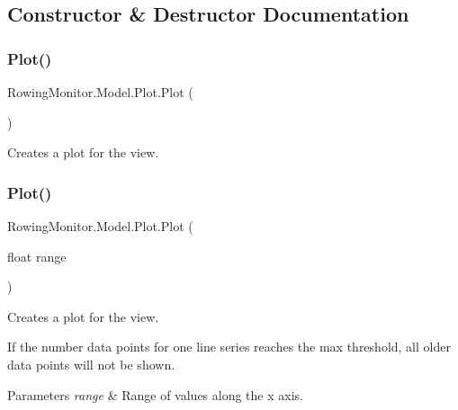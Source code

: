 \subsection{Constructor \& Destructor Documentation}
\mbox{\label{class_rowing_monitor_1_1_model_1_1_plot_a950ad596730f1ff80a5998f16a4c0d3c}} 
\subsubsection{\texorpdfstring{Plot()}{Plot()}\hspace{0.1cm}{\footnotesize\ttfamily [1/2]}}
{\footnotesize\ttfamily Rowing\+Monitor.\+Model.\+Plot.\+Plot (\begin{DoxyParamCaption}{ }\end{DoxyParamCaption})}



Creates a plot for the view. 

\mbox{\label{class_rowing_monitor_1_1_model_1_1_plot_a12760bee76f583deb2741bc223be33e2}} 
\subsubsection{\texorpdfstring{Plot()}{Plot()}\hspace{0.1cm}{\footnotesize\ttfamily [2/2]}}
{\footnotesize\ttfamily Rowing\+Monitor.\+Model.\+Plot.\+Plot (\begin{DoxyParamCaption}\item[{float}]{range }\end{DoxyParamCaption})}



Creates a plot for the view. 

If the number data points for one line series reaches the max threshold, all older data points will not be shown. 


\begin{DoxyParams}{Parameters}
{\em range} & Range of values along the x axis.\\
\hline
\end{DoxyParams}


